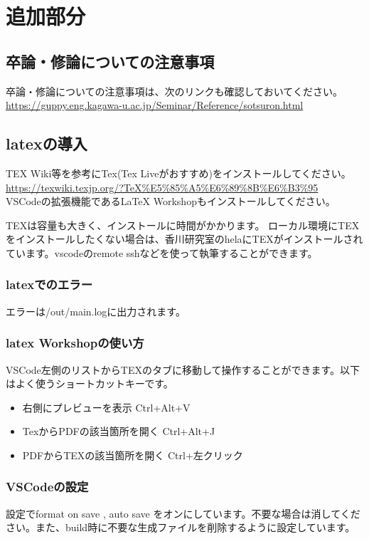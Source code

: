 \chapter{追加部分}
\section{卒論・修論についての注意事項}
卒論・修論についての注意事項は、次のリンクも確認しておいてください。\\
\url{https://guppy.eng.kagawa-u.ac.jp/Seminar/Reference/sotsuron.html}
\section{latexの導入}
TEX Wiki等を参考にTex(Tex Liveがおすすめ)をインストールしてください。\\
\url{https://texwiki.texjp.org/?TeX%E5%85%A5%E6%89%8B%E6%B3%95}\\
VSCodeの拡張機能であるLaTeX Workshopもインストールしてください。

TEXは容量も大きく、インストールに時間がかかります。
ローカル環境にTEXをインストールしたくない場合は、香川研究室のhelaにTEXがインストールされています。vscodeのremote sshなどを使って執筆することができます。
\subsection{latexでのエラー}
エラーは/out/main.logに出力されます。
\subsection{latex Workshopの使い方}
VSCode左側のリストからTEXのタブに移動して操作することができます。以下はよく使うショートカットキーです。
\begin{itemize}
  \item 右側にプレビューを表示 Ctrl+Alt+V
  \item TexからPDFの該当箇所を開く Ctrl+Alt+J
  \item PDFからTEXの該当箇所を開く Ctrl+左クリック
\end{itemize}
\subsection{VSCodeの設定}
設定でformat on save , auto save をオンにしています。不要な場合は消してください。また、build時に不要な生成ファイルを削除するように設定しています。


